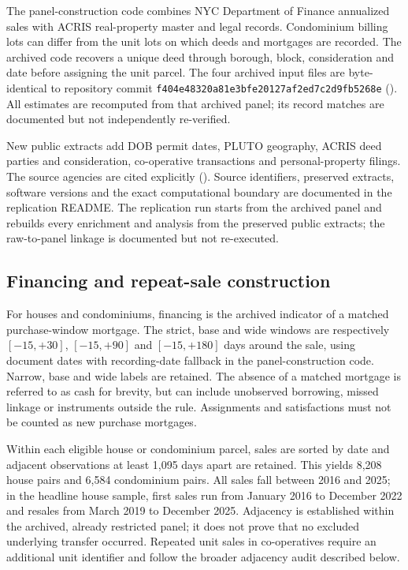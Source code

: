 \documentclass[12pt]{article}
\begin{document}
The panel-construction code combines NYC Department of Finance annualized sales with ACRIS real-property master and legal records. Condominium billing lots can differ from the unit lots on which deeds and mortgages are recorded. The archived code recovers a unique deed through borough, block, consideration and date before assigning the unit parcel. The four archived input files are byte-identical to repository commit \texttt{f404e48320a81e3bfe20127af2ed7c2d9fb5268e} (\citealp{loschicode2026}). All estimates are recomputed from that archived panel; its record matches are documented but not independently re-verified.

New public extracts add DOB permit dates, PLUTO geography, ACRIS deed parties and consideration, co-operative transactions and personal-property filings. The source agencies are cited explicitly (\citealp{nycsales2026,acrisrp2026,acrispp2026,dob2026,pluto2026,pmms2026}). Source identifiers, preserved extracts, software versions and the exact computational boundary are documented in the replication README. The replication run starts from the archived panel and rebuilds every enrichment and analysis from the preserved public extracts; the raw-to-panel linkage is documented but not re-executed.

\subsection{Financing and repeat-sale construction}
For houses and condominiums, financing is the archived indicator of a matched purchase-window mortgage. The strict, base and wide windows are respectively $[-15,+30]$, $[-15,+90]$ and $[-15,+180]$ days around the sale, using document dates with recording-date fallback in the panel-construction code. Narrow, base and wide labels are retained. The absence of a matched mortgage is referred to as cash for brevity, but can include unobserved borrowing, missed linkage or instruments outside the rule. Assignments and satisfactions must not be counted as new purchase mortgages.

Within each eligible house or condominium parcel, sales are sorted by date and adjacent observations at least 1,095 days apart are retained. This yields 8,208 house pairs and 6,584 condominium pairs. All sales fall between 2016 and 2025; in the headline house sample, first sales run from January 2016 to December 2022 and resales from March 2019 to December 2025. Adjacency is established within the archived, already restricted panel; it does not prove that no excluded underlying transfer occurred. Repeated unit sales in co-operatives require an additional unit identifier and follow the broader adjacency audit described below.
\end{document}
